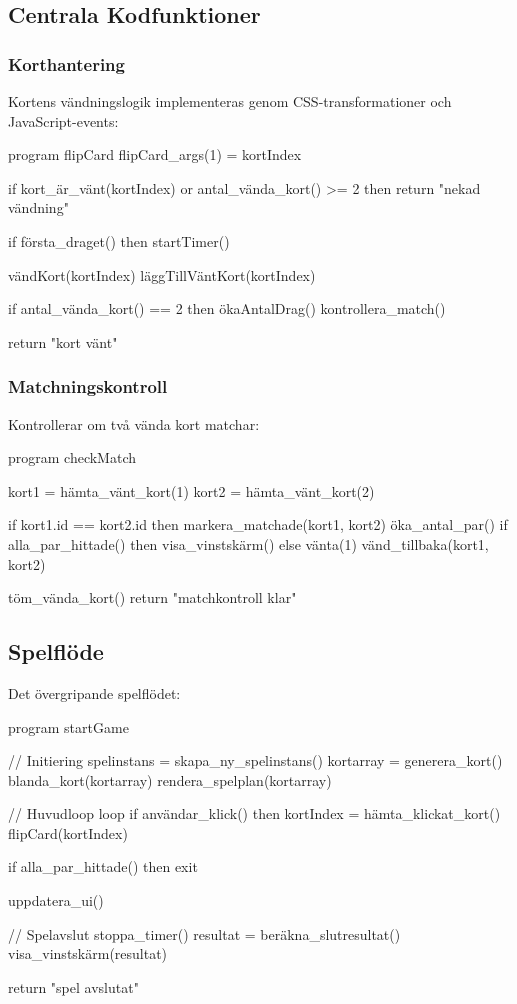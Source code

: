 \documentclass[a4paper,12pt]{article}
\begin{document}
\subsection*{Centrala Kodfunktioner}
\subsubsection*{Korthantering}
Kortens vändningslogik implementeras genom CSS-transformationer och JavaScript-events:

\begin{codebox}
program flipCard
flipCard_args(1) = kortIndex

if kort_är_vänt(kortIndex) or antal_vända_kort() >= 2 then
    return "nekad vändning"

if första_draget() then
    startTimer()

vändKort(kortIndex)
läggTillVäntKort(kortIndex)

if antal_vända_kort() == 2 then
    ökaAntalDrag()
    kontrollera_match()

return "kort vänt"
\end{codebox}

\subsubsection*{Matchningskontroll}
Kontrollerar om två vända kort matchar:

\begin{codebox}
program checkMatch

kort1 = hämta_vänt_kort(1)
kort2 = hämta_vänt_kort(2)

if kort1.id == kort2.id then
    markera_matchade(kort1, kort2)
    öka_antal_par()
    if alla_par_hittade() then
        visa_vinstskärm()
else
    vänta(1)
    vänd_tillbaka(kort1, kort2)

töm_vända_kort()
return "matchkontroll klar"
\end{codebox}

\subsection*{Spelflöde}
Det övergripande spelflödet:

\begin{codebox}
program startGame

// Initiering
spelinstans = skapa_ny_spelinstans()
kortarray = generera_kort()
blanda_kort(kortarray)
rendera_spelplan(kortarray)

// Huvudloop
loop
    if användar_klick() then
        kortIndex = hämta_klickat_kort()
        flipCard(kortIndex)
        
    if alla_par_hittade() then
        exit

    uppdatera_ui()

// Spelavslut
stoppa_timer()
resultat = beräkna_slutresultat()
visa_vinstskärm(resultat)

return "spel avslutat"
\end{codebox}
\end{document}
